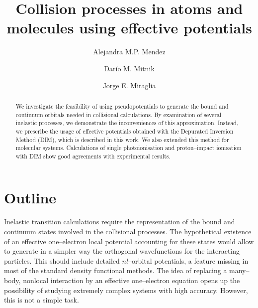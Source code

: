\documentclass[10pt]{article}
\begin{document}
\title{Collision processes in atoms and molecules using effective 
potentials}
\author[ ]{Alejandra M.P. Mendez}
\author[ ]{Dar\'io M. Mitnik}
\author[ ]{Jorge E. Miraglia}

\maketitle

\tableofcontents

\begin{abstract}
We investigate the feasibility of using pseudopotentials to generate
the bound and continuum orbitals needed in collisional calculations. 
By examination of several inelastic processes, we demonstrate the 
inconveniences of this approximation. Instead, we prescribe 
the usage of effective potentials obtained with the Depurated Inversion 
Method (DIM), which is described in this work. We also extended this method 
for molecular systems. Calculations of single photoionisation and 
proton--impact ionisation with DIM show good agreements with 
experimental results.
\end{abstract}


\section{Outline}

Inelastic transition calculations require the representation of 
the bound and continuum states involved in the collisional processes. 
The hypothetical existence of an effective one--electron local 
potential accounting for these states would allow to generate in a 
simpler way the orthogonal wavefunctions for the interacting particles.
This should include detailed $nl$--orbital potentials, a feature 
missing in most of the standard density functional methods. 
The idea of replacing a many--body, nonlocal interaction by
an effective one--electron equation opens up the possibility of studying
extremely complex systems with high accuracy. 
However, this is not a simple task.
\end{document}
